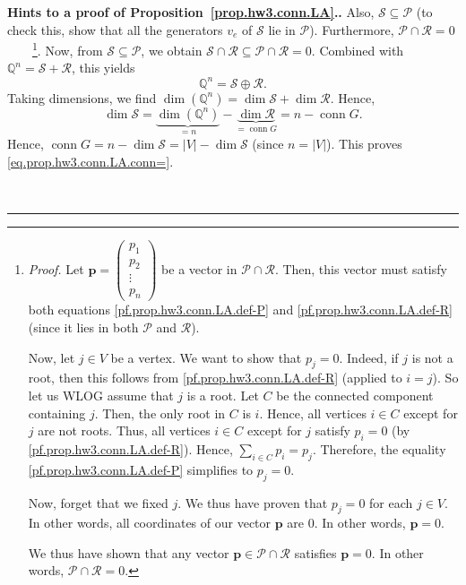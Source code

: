 \documentclass[numbers=enddot,12pt,final,onecolumn,notitlepage]{scrartcl}%
\theoremstyle{definition}
\newenvironment{proof}[1][Proof]{\noindent\textbf{#1.} }{\ \rule{0.5em}{0.5em}}
\let\sumnonlimits\sum
\renewcommand{\sum}{\sumnonlimits\limits}
\newcommand{\conn}{\operatorname{conn}}
\newcommand{\QQ}{\mathbb{Q}}
\newcommand{\abs}[1]{\left| #1 \right|}
\newcommand{\tup}[1]{\left( #1 \right)}
\begin{document}
\begin{proof}[Hints to a proof of Proposition~\ref{prop.hw3.conn.LA}.]
Also, $\mathcal{S} \subseteq \mathcal{P}$ (to check this,
show that all the generators $v_e$ of $\mathcal{S}$ lie in
$\mathcal{P}$).
Furthermore,
$\mathcal{P} \cap \mathcal{R} = 0$\ \ \ \ \footnote{
  \textit{Proof.} Let $\mathbf{p} = \left(
   \begin{matrix} p_1 \\ p_2 \\ \vdots \\ p_n \end{matrix}
    \right)$ be a vector in $\mathcal{P} \cap \mathcal{R}$.
  Then, this vector must satisfy both equations
  \eqref{pf.prop.hw3.conn.LA.def-P} and
  \eqref{pf.prop.hw3.conn.LA.def-R} (since it lies in
  both $\mathcal{P}$ and $\mathcal{R}$).
  \par
  Now, let $j \in V$ be a vertex.
  We want to show that $p_j = 0$.
  Indeed, if $j$ is not a root, then this follows
  from \eqref{pf.prop.hw3.conn.LA.def-R} (applied to $i = j$).
  So let us WLOG assume that $j$ is a root.
  Let $C$ be the connected component containing $j$.
  Then, the only root in $C$ is $i$.
  Hence, all vertices $i \in C$ except for $j$ are not
  roots.
  Thus, all vertices $i \in C$ except for $j$ satisfy
  $p_i = 0$ (by \eqref{pf.prop.hw3.conn.LA.def-R}).
  Hence, $\sum_{i \in C} p_i = p_j$. Therefore, the equality
  \eqref{pf.prop.hw3.conn.LA.def-P} simplifies to
  $p_j = 0$.
  \par
  Now, forget that we fixed $j$.
  We thus have proven that $p_j = 0$ for each $j \in V$.
  In other words, all coordinates of our vector $\mathbf{p}$
  are $0$.
  In other words, $\mathbf{p} = 0$.
  \par
  We thus have shown that any vector
  $\mathbf{p} \in \mathcal{P} \cap \mathcal{R}$ satisfies
  $\mathbf{p} = 0$.
  In other words, $\mathcal{P} \cap \mathcal{R} = 0$.}.
Now, from $\mathcal{S} \subseteq \mathcal{P}$, we obtain
$\mathcal{S} \cap \mathcal{R}
\subseteq \mathcal{P} \cap \mathcal{R} = 0$.
Combined with $\QQ^n = \mathcal{S} + \mathcal{R}$, this
yields
\[
\QQ^n = \mathcal{S} \oplus \mathcal{R} .
\]
Taking dimensions, we find
$
\dim \tup{\QQ^n} = \dim \mathcal{S} + \dim \mathcal{R}
$.
Hence,
\[
\dim \mathcal{S} = \underbrace{\dim \tup{\QQ^n}}_{= n}
                    - \underbrace{\dim \mathcal{R}}_{= \conn G}
                 = n - \conn G.
\]
Hence,
$\conn G = n - \dim \mathcal{S} = \abs{V} - \dim \mathcal{S}$
(since $n = \abs{V}$).
This proves \eqref{eq.prop.hw3.conn.LA.conn=}.


\end{proof}
\end{document}

